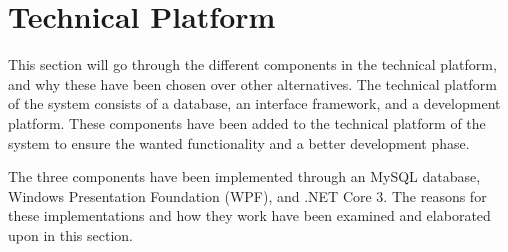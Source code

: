 \section{Technical Platform} \label{sc:tech_intro}
This section will go through the different components in the technical platform, and why these have been chosen over other alternatives. The technical platform of the system consists of a database, an interface framework, and a development platform. These components have been added to the technical platform of the system to ensure the wanted functionality and a better development phase.
\par
The three components have been implemented through an MySQL database, Windows Presentation Foundation (WPF), and .NET Core 3. The reasons for these implementations and how they work have been examined and elaborated upon in this section.